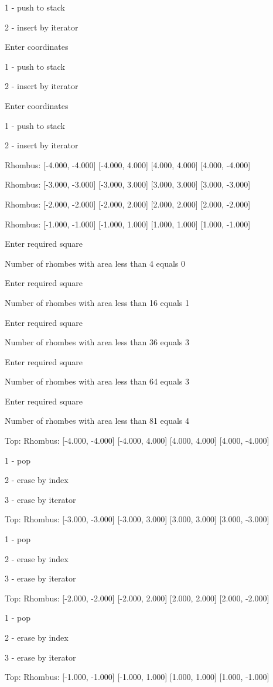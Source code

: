 \documentclass[a4paper, 12pt]{article}
\begin{document}
1 - push to stack

2 - insert by iterator

Enter coordinates

1 - push to stack

2 - insert by iterator

Enter coordinates

1 - push to stack

2 - insert by iterator

Rhombus: [-4.000, -4.000] [-4.000, 4.000] [4.000, 4.000] [4.000, -4.000] 

Rhombus: [-3.000, -3.000] [-3.000, 3.000] [3.000, 3.000] [3.000, -3.000] 

Rhombus: [-2.000, -2.000] [-2.000, 2.000] [2.000, 2.000] [2.000, -2.000] 

Rhombus: [-1.000, -1.000] [-1.000, 1.000] [1.000, 1.000] [1.000, -1.000] 

Enter required square

Number of rhombes with area less than 4 equals 0

Enter required square

Number of rhombes with area less than 16 equals 1

Enter required square

Number of rhombes with area less than 36 equals 3

Enter required square

Number of rhombes with area less than 64 equals 3

Enter required square

Number of rhombes with area less than 81 equals 4

Top: Rhombus: [-4.000, -4.000] [-4.000, 4.000] [4.000, 4.000] [4.000, -4.000] 

1 - pop

2 - erase by index

3 - erase by iterator

Top: Rhombus: [-3.000, -3.000] [-3.000, 3.000] [3.000, 3.000] [3.000, -3.000] 

1 - pop

2 - erase by index

3 - erase by iterator

Top: Rhombus: [-2.000, -2.000] [-2.000, 2.000] [2.000, 2.000] [2.000, -2.000] 

1 - pop

2 - erase by index

3 - erase by iterator

Top: Rhombus: [-1.000, -1.000] [-1.000, 1.000] [1.000, 1.000] [1.000, -1.000] 
\end{document}
